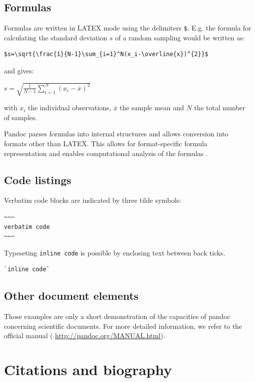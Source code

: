 \documentclass[10pt,fleqn]{wlpeerj}
\begin{document}
\subsection{Formulas}\label{formulas}

Formulas
are
written
in
LATEX
mode
using
the
delimiters
\texttt{\$}.
E.g.
the
formula
for
calculating
the
standard
deviation
\(s\)
of a
random
sampling
would
be
written
as:

\begin{verbatim}
$s=\sqrt{\frac{1}{N-1}\sum_{i=1}^N(x_i-\overline{x})^{2}}$
\end{verbatim}

and
gives:

\(s=\sqrt{\frac{1}{N-1}\sum_{i=1}^N(x_i-\overline{x})^{2}}\)

with
\(x_i\)
the
individual
observations,
\(\overline{x}\)
the
sample
mean
and
\(N\)
the
total
number
of
samples.

Pandoc
parses
formulas
into
internal
structures
and
allows
conversion
into
formats
other
than
LATEX.
This
allows
for
format-specific
formula
representation
and
enables
computational
analysis
of
the
formulas
\citep{garnet_semiautomatic_2015}.

\subsection{Code
listings}\label{code-listings}

Verbatim
code
blocks
are
indicated
by
three
tilde
symbols:

\begin{verbatim}
~~~
verbatim code
~~~
\end{verbatim}

Typeseting
\texttt{inline\ code}
is
possible
by
enclosing
text
between
back
ticks.

\begin{verbatim}
`inline code`
\end{verbatim}

\subsection{Other
document
elements}\label{other-document-elements}

Those
examples
are
only
a
short
demonstration
of
the
capacities
of
pandoc
concerning
scientific
documents.
For
more
detailed
information,
we
refer
to
the
official
manual
(
\url{http://pandoc.org/MANUAL.html}).

\section{Citations
and
biography}\label{citations-and-biography}
\end{document}
